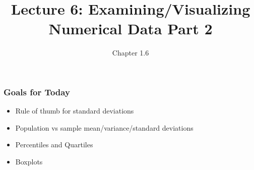 \documentclass[handout]{beamer}
\title{Lecture 6: Examining/Visualizing Numerical Data Part 2}
\author{Chapter 1.6}
\date{}
\newcommand{\blue}[1]{\textcolor{blue2}{#1}}
\begin{document}
\begin{frame}
\titlepage
\end{frame}

%
%
%
%
%
%
%
%


\begin{frame}[fragile]
\frametitle{Goals for Today}

\begin{itemize}
\item Rule of thumb for standard deviations
\item Population vs sample mean/variance/standard deviations
\item Percentiles and Quartiles
\item Boxplots
\end{itemize}

\end{frame}
\end{document}
